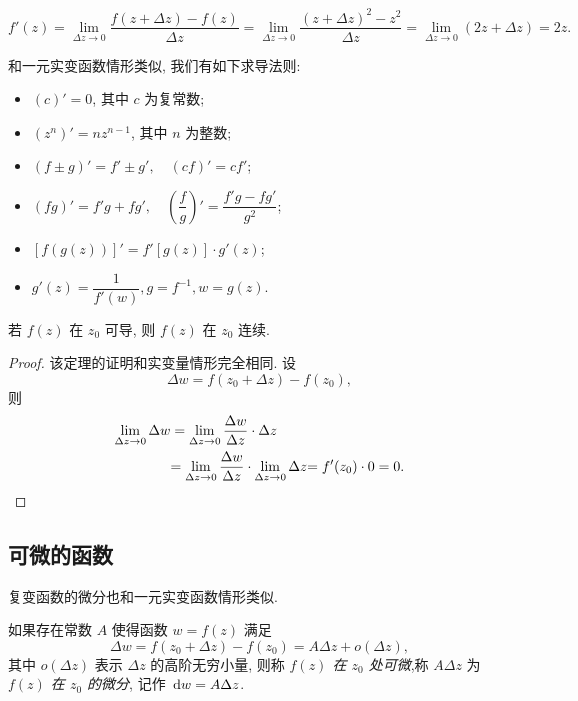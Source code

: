 \documentclass[nocolor,theme=doremi,lang=cn,11pt,chinese,twoside,openright,usesamecnt]{elegantbook}
\begin{document}
\begin{solution}
	\[
	f'(z)=\lim_{\Delta z\to 0}\frac{f(z+\Delta z)-f(z)}{\Delta z}
	{=\lim_{\Delta z\to 0}\frac{(z+\Delta z)^2-z^2}{\Delta z}}
	{=\lim_{\Delta z\to 0}(2z+\Delta z)=2z.}
	\]
\end{solution}

和一元实变函数情形类似, 我们有如下求导法则:
\begin{theorem}
	\begin{itemize}
		\item $(c)'=0$, 其中 $c$ 为复常数;
		\item $(z^n)'=nz^{n-1}$, 其中 $n$ 为整数;
		\item $(f\pm g)'=f'\pm g',\quad (cf)'=cf'$;
		\item $(fg)'=f'g+fg',\quad \left(\dfrac fg\right)'=\dfrac{f'g-fg'}{g^2}$;
		\item $[f(g(z))]'=f'[g(z)]\cdot g'(z)$;
		\item $g'(z)=\dfrac1{f'(w)}, g=f^{-1}, w=g(z)$.
	\end{itemize}
\end{theorem}

\begin{theorem}
	若 $f(z)$ 在 $z_0$ 可导, 则 $f(z)$ 在 $z_0$ 连续.
\end{theorem}

\begin{proof}
	该定理的证明和实变量情形完全相同.
	{设 \[\Delta w=f(z_0+\Delta z)-f(z_0),\]则
		\begin{align*}
		\lim_{\Delta z\to 0}\Delta w&=\lim_{\Delta z\to 0}\frac{\Delta w}{\Delta z}\cdot\Delta z\\
		&{=\lim_{\Delta z\to 0}\frac{\Delta w}{\Delta z}\cdot\lim_{\Delta z\to 0}\Delta z}
		{=f'(z_0)\cdot 0=0.}\qedhere
		\end{align*}}
\end{proof}

\subsection{可微的函数}

复变函数的微分也和一元实变函数情形类似.

\begin{definition}
	如果存在常数 $A$ 使得函数 $w=f(z)$ 满足
	\[\Delta w=f(z_0+\Delta z)-f(z_0)=A\Delta z+o(\Delta z),\]
	其中 $o(\Delta z)$ 表示 $\Delta z$ 的高阶无穷小量,
	{则称 \emph{$f(z)$ 在 $z_0$ 处可微},称 $A\Delta z$ 为 \emph{$f(z)$ 在 $z_0$ 的微分}, 记作 $\,\mathrm{d} w=A \Delta z$.}
\end{definition}
\end{document}
